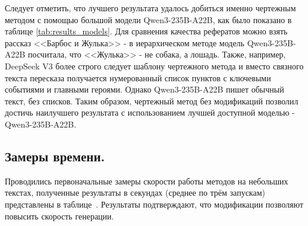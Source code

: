 \documentclass{superfri}
\begin{document}
Следует отметить, что лучшего результата удалось добиться именно чертежным методом с помощью большой модели Qwen3-\allowbreak 235B-\allowbreak A22B, 
как было показано в таблице \ref{tab:results_models}. Для сравнения качества рефератов можно взять рассказ <<Барбос и Жулька>> - в иерархическом методе
модель Qwen3-\allowbreak 235B-\allowbreak A22B посчитала, что <<Жулька>> - не собака, а лошадь. Также, например, DeepSeek V3 более строго следует шаблону чертежного метода и вместо связного текста пересказа получается нумерованный список
пунктов с ключевыми событиями и главными героями. Однако Qwen3-\allowbreak 235B-\allowbreak A22B пишет обычный текст, без списков. Таким образом, чертежный метод без модификаций позволил достичь наилучшего результата с использованием лучшей доступной моделью - 
Qwen3-\allowbreak 235B-\allowbreak A22B.

\subsection{Замеры времени.}
Проводились первоначальные замеры скорости работы методов на небольших текстах, полученные результаты в секундах (среднее по трём запускам) представлены в таблице~.
Результаты подтверждают, что модификации позволяют повысить скорость генерации.

\end{document}
